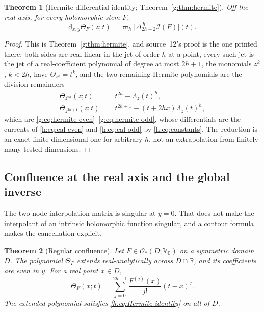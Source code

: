 \documentclass[11pt,a4paper]{article}
\numberwithin{equation}{section}
\newtheorem{theorem}{Theorem}[section]
\theoremstyle{definition}
\theoremstyle{remark}
\theoremstyle{plain}
\newcommand{\RR}{\mathbb R}
\newcommand{\CC}{\mathbb C}
\newcommand{\I}{\mathcal I}
\newcommand{\dd}{\mathrm d}
\newcommand{\lapH}{\Delta_{2h+2}^{\,h}}
\newcommand{\VC}{\mathbb V_{\CC}}                 %
\newcommand{\cur}{\varpi}                         %
\newcommand{\Herm}{\Theta}                        %
\newcommand{\Rq}{\Lambda}                         %
\begin{document}
\begin{theorem}[Hermite differential identity; Theorem~\ref{g:thm:hermite}]
\label{h:thm:Hermite}
Off the real axis, for every holomorphic stem $F$,
\begin{equation}\label{h:eq:Hermite-identity}
 \dd_{x,y}\Herm_F(z;t)=\cur_h\bigl[\lapH\I(F)\bigr](t).
\end{equation}
\end{theorem}

\begin{proof}
This is Theorem~\ref{g:thm:hermite}, and source~12's proof is the one printed
there: both sides are real-linear in the jet of order $h$ at a point, every
such jet is the jet of a real-coefficient polynomial of degree at most $2h+1$,
the monomials $z^k$, $k<2h$, have $\Herm_{z^k}=t^k$, and the two remaining
Hermite polynomials are the division remainders
\begin{align}
 \Herm_{z^{2h}}(z;t)&=t^{2h}-\Rq_z(t)^h,\label{h:eq:rem-even}\\
 \Herm_{z^{2h+1}}(z;t)&=t^{2h+1}-(t+2hx)\Rq_z(t)^h,\label{h:eq:rem-odd}
\end{align}
which are \eqref{g:eq:hermite-even}--\eqref{g:eq:hermite-odd}, whose
differentials are the currents of \eqref{h:eq:cal-even} and
\eqref{h:eq:cal-odd} by \eqref{h:eq:constants}. The reduction is an exact
finite-dimensional one for arbitrary $h$, not an extrapolation from finitely
many tested dimensions.
\end{proof}

\subsection{Confluence at the real axis and the global inverse}
\label{h:sec:axis}

The two-node interpolation matrix is singular at $y=0$. That does not make the
interpolant of an intrinsic holomorphic function singular, and a contour
formula makes the cancellation explicit.

\begin{theorem}[Regular confluence]\label{h:thm:confluence}
Let $F\in\mathcal O_*(D;\VC)$ on a symmetric domain $D$. The polynomial
$\Herm_F$ extends real-analytically across $D\cap\RR$, and its coefficients are
even in $y$. For a real point $x\in D$,
\begin{equation}\label{h:eq:axis-Taylor}
 \Herm_F(x;t)=\sum_{j=0}^{2h-1}\frac{F^{(j)}(x)}{j!}(t-x)^j .
\end{equation}
The extended polynomial satisfies \eqref{h:eq:Hermite-identity} on all of $D$.
\end{theorem}
\end{document}
